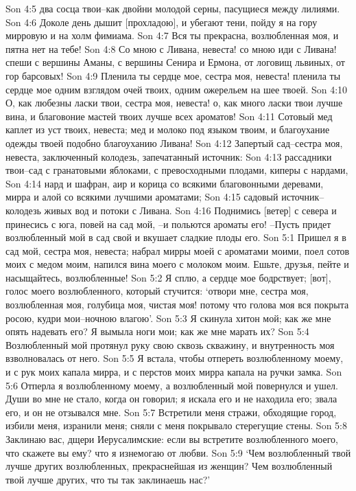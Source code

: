 Son 4:5  два сосца твои--как двойни молодой серны, пасущиеся между лилиями.
Son 4:6  Доколе день дышит [прохладою], и убегают тени, пойду я на гору мирровую и на холм фимиама.
Son 4:7  Вся ты прекрасна, возлюбленная моя, и пятна нет на тебе!
Son 4:8  Со мною с Ливана, невеста! со мною иди с Ливана! спеши с вершины Аманы, с вершины Сенира и Ермона, от логовищ львиных, от гор барсовых!
Son 4:9  Пленила ты сердце мое, сестра моя, невеста! пленила ты сердце мое одним взглядом очей твоих, одним ожерельем на шее твоей.
Son 4:10  О, как любезны ласки твои, сестра моя, невеста! о, как много ласки твои лучше вина, и благовоние мастей твоих лучше всех ароматов!
Son 4:11  Сотовый мед каплет из уст твоих, невеста; мед и молоко под языком твоим, и благоухание одежды твоей подобно благоуханию Ливана!
Son 4:12  Запертый сад--сестра моя, невеста, заключенный колодезь, запечатанный источник:
Son 4:13  рассадники твои--сад с гранатовыми яблоками, с превосходными плодами, киперы с нардами,
Son 4:14  нард и шафран, аир и корица со всякими благовонными деревами, мирра и алой со всякими лучшими ароматами;
Son 4:15  садовый источник--колодезь живых вод и потоки с Ливана.
Son 4:16  Поднимись [ветер] с севера и принесись с юга, повей на сад мой, --и польются ароматы его! --Пусть придет возлюбленный мой в сад свой и вкушает сладкие плоды его.
Son 5:1  Пришел я в сад мой, сестра моя, невеста; набрал мирры моей с ароматами моими, поел сотов моих с медом моим, напился вина моего с молоком моим. Ешьте, друзья, пейте и насыщайтесь, возлюбленные!
Son 5:2  Я сплю, а сердце мое бодрствует; [вот], голос моего возлюбленного, который стучится: `отвори мне, сестра моя, возлюбленная моя, голубица моя, чистая моя! потому что голова моя вся покрыта росою, кудри мои--ночною влагою'.
Son 5:3  Я скинула хитон мой; как же мне опять надевать его? Я вымыла ноги мои; как же мне марать их?
Son 5:4  Возлюбленный мой протянул руку свою сквозь скважину, и внутренность моя взволновалась от него.
Son 5:5  Я встала, чтобы отпереть возлюбленному моему, и с рук моих капала мирра, и с перстов моих мирра капала на ручки замка.
Son 5:6  Отперла я возлюбленному моему, а возлюбленный мой повернулся и ушел. Души во мне не стало, когда он говорил; я искала его и не находила его; звала его, и он не отзывался мне.
Son 5:7  Встретили меня стражи, обходящие город, избили меня, изранили меня; сняли с меня покрывало стерегущие стены.
Son 5:8  Заклинаю вас, дщери Иерусалимские: если вы встретите возлюбленного моего, что скажете вы ему? что я изнемогаю от любви.
Son 5:9  `Чем возлюбленный твой лучше других возлюбленных, прекраснейшая из женщин? Чем возлюбленный твой лучше других, что ты так заклинаешь нас?'
